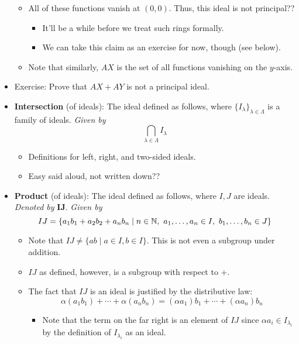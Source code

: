 \documentclass[../notes.tex]{subfiles}
\begin{document}
\begin{itemize}
\begin{itemize}
        \item All of these functions vanish at $(0,0)$. Thus, this ideal is not principal??
        \begin{itemize}
            \item It'll be a while before we treat such rings formally.
            \item We can take this claim as an exercise for now, though (see below).
        \end{itemize}
        \item Note that similarly, $AX$ is the set of all functions vanishing on the $y$-axis.
    \end{itemize}
    \item Exercise: Prove that $AX+AY$ is not a principal ideal.
    \item \textbf{Intersection} (of ideals): The ideal defined as follows, where $\{I_\lambda\}_{\lambda\in\Lambda}$ is a family of ideals. \emph{Given by}
    \begin{equation*}
        \bigcap_{\lambda\in\Lambda}I_\lambda
    \end{equation*}
    \begin{itemize}
        \item Definitions for left, right, and two-sided ideals.
        \item Easy said aloud, not written down??
    \end{itemize}
    \item \textbf{Product} (of ideals): The ideal defined as follows, where $I,J$ are ideals. \emph{Denoted by} $\bm{IJ}$. \emph{Given by}
    \begin{equation*}
        IJ = \{a_1b_1+a_2b_2+a_nb_n\mid n\in\N,\ a_1,\dots,a_n\in I,\ b_1,\dots,b_n\in J\}
    \end{equation*}
    \begin{itemize}
        \item Note that $IJ\neq\{ab\mid a\in I,b\in I\}$. This is not even a subgroup under addition.
        \item $IJ$ as defined, however, is a subgroup with respect to $+$.
        \item The fact that $IJ$ is an ideal is justified by the distributive law:
        \begin{equation*}
            \alpha(a_1b_1)+\cdots+\alpha(a_nb_n) = (\alpha a_1)b_1+\cdots+(\alpha a_n)b_n
        \end{equation*}
        \begin{itemize}
            \item Note that the term on the far right is an element of $IJ$ since $\alpha a_i\in I_{\lambda_i}$ by the definition of $I_{\lambda_i}$ as an ideal.

\end{itemize}
\end{itemize}
\end{itemize}
\end{document}
